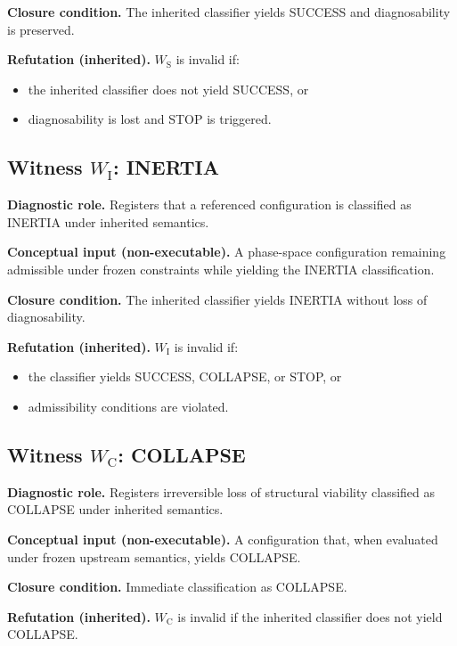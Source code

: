 \textbf{Closure condition.}
The inherited classifier yields SUCCESS
and diagnosability is preserved.

\textbf{Refutation (inherited).}
$W_{\mathrm{S}}$ is invalid if:
\begin{itemize}
  \item the inherited classifier does not yield SUCCESS, or
  \item diagnosability is lost and STOP is triggered.
\end{itemize}

\subsection{\texorpdfstring{Witness $W_{\mathrm{I}}$: INERTIA}{Witness WI: INERTIA}}

\textbf{Diagnostic role.}
Registers that a referenced configuration is classified as INERTIA
under inherited semantics.

\textbf{Conceptual input (non-executable).}
A phase-space configuration remaining admissible under frozen constraints
while yielding the INERTIA classification.

\textbf{Closure condition.}
The inherited classifier yields INERTIA
without loss of diagnosability.

\textbf{Refutation (inherited).}
$W_{\mathrm{I}}$ is invalid if:
\begin{itemize}
  \item the classifier yields SUCCESS, COLLAPSE, or STOP, or
  \item admissibility conditions are violated.
\end{itemize}

\subsection{\texorpdfstring{Witness $W_{\mathrm{C}}$: COLLAPSE}{Witness WC: COLLAPSE}}

\textbf{Diagnostic role.}
Registers irreversible loss of structural viability
classified as COLLAPSE under inherited semantics.

\textbf{Conceptual input (non-executable).}
A configuration that, when evaluated under frozen upstream semantics,
yields COLLAPSE.

\textbf{Closure condition.}
Immediate classification as COLLAPSE.

\textbf{Refutation (inherited).}
$W_{\mathrm{C}}$ is invalid if the inherited classifier
does not yield COLLAPSE.

